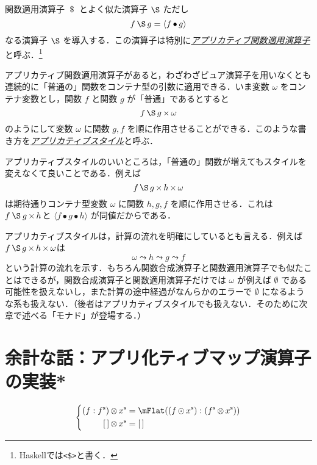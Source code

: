 \documentclass[a4paper,draft]{jsbook}
\newcommand{\programminglanguage}[1]{\textsf{#1}}
\newcommand{\haskell}{\programminglanguage{Haskell}}
\newcommand{\keyword}[1]{{\underline{\emph{#1}}}}
\newcommand{\code}[1]{\texttt{#1}}
\newcommand{\mEmptyList}{{[\,]}}
\newcommand{\mNothing}{\emptyset}
\newcommand{\mPureWith}[1]{\langle#1\rangle}
\newcommand{\mList}[1]{{#1}^\mathrm{s}}
\DeclareMathOperator{\mComp}{\bullet}
\DeclareMathOperator{\mApply}{\$}
\DeclareMathOperator{\mFlow}{\leadsto}
\DeclareMathOperator{\mMapList}{\odot}
\DeclareMathOperator{\mApplicativeApply}{\S}
\DeclareMathOperator{\mApplicativeMap}{\times}
\DeclareMathOperator{\mApplicativeMapList}{\otimes}
\newcommand{\mathApplicativeApply}{\mathbin{\S}}
\begin{document}
関数適用演算子 $\mApply$ とよく似た演算子 $\mApplicativeApply$ ただし
\begin{equation}
f\mApplicativeApply g=\mPureWith{f\mComp g}
\end{equation}
なる演算子 $\mApplicativeApply$ を導入する．この演算子は特別に\keyword{アプリカティブ関数適用演算子}と呼ぶ．\footnote{\haskell では\code{<\$>}と書く．}

アプリカティブ関数適用演算子があると，わざわざピュア演算子を用いなくとも連続的に「普通の」関数をコンテナ型の引数に適用できる．いま変数 $\omega$ をコンテナ変数とし，関数 $f$ と関数 $g$ が「普通」であるとすると
\begin{equation}
f\mApplicativeApply g\mApplicativeMap\omega
\end{equation}
のようにして変数 $\omega$ に関数 $g,f$ を順に作用させることができる．このような書き方を\keyword{アプリカティブスタイル}と呼ぶ．

アプリカティブスタイルのいいところは，「普通の」関数が増えてもスタイルを変えなくて良いことである．例えば
\begin{equation}
f\mApplicativeApply g\mApplicativeMap h\mApplicativeMap\omega
\end{equation}
は期待通りコンテナ型変数 $\omega$ に関数 $h,g,f$ を順に作用させる．これは $f\mathApplicativeApply g\mApplicativeMap h$と $\mPureWith{f\mComp g\mComp h}$ が同値だからである．

アプリカティブスタイルは，計算の流れを明確にしているとも言える．例えば $f\mApplicativeApply g\mApplicativeMap h\mApplicativeMap\omega$は
\begin{equation}
\omega\mFlow h\mFlow g\mFlow f
\end{equation}
という計算の流れを示す．もちろん関数合成演算子と関数適用演算子でも似たことはできるが，関数合成演算子と関数適用演算子だけでは $\omega$ が例えば $\mNothing$ である可能性を扱えないし，また計算の途中経過がなんらかのエラーで $\mNothing$ になるような系も扱えない．（後者はアプリカティブスタイルでも扱えない．そのために次章で述べる「モナド」が登場する．）

\section{余計な話：アプリ化ティブマップ演算子の実装*}

\begin{equation}
\left\{
\begin{split}
(f:\mList{f})\mApplicativeMapList\mList{x}&=\mFlat((f\mMapList\mList{x}):(\mList{f}\mApplicativeMapList\mList{x}))\\
\mEmptyList\mApplicativeMapList\mList{x}&=\mEmptyList
\end{split}
\right.
\end{equation}
\end{document}

